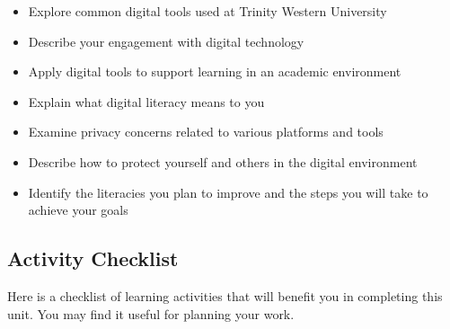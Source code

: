 \documentclass[
  letterpaper,
  DIV=11,
  numbers=noendperiod]{scrreprt}
\providecommand{\tightlist}{%
  \setlength{\itemsep}{0pt}\setlength{\parskip}{0pt}}\usepackage{longtable,booktabs,array}
\begin{document}
\begin{itemize}
\tightlist
\item
  Explore common digital tools used at Trinity Western University
\item
  Describe your engagement with digital technology
\item
  Apply digital tools to support learning in an academic environment
\item
  Explain what digital literacy means to you
\item
  Examine privacy concerns related to various platforms and tools
\item
  Describe how to protect yourself and others in the digital environment
\item
  Identify the literacies you plan to improve and the steps you will
  take to achieve your goals
\end{itemize}

\subsection*{Activity Checklist}\label{activity-checklist}

Here is a checklist of learning activities that will benefit you in
completing this unit. You may find it useful for planning your work.
\end{document}
